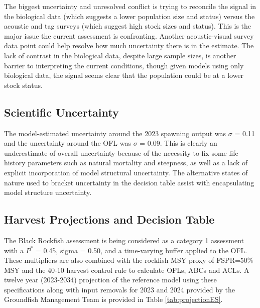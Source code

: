 \documentclass[11pt,
  english,
  letterpaper,
]{article}
\begin{document}
The biggest uncertainty and unresolved conflict is trying to reconcile the signal in the biological data (which suggests a lower population size and status) versus the acoustic and tag surveys (which suggest high stock sizes and status). This is the major issue the current assessment is confronting. Another acoustic-visual survey data point could help resolve how much uncertainty there is in the estimate. The lack of contrast in the biological data, despite large sample sizes, is another barrier to interpreting the current conditions, though given models using only biological data, the signal seems clear that the population could be at a lower stock status.

\hypertarget{scientific-uncertainty}{%
\subsection*{Scientific Uncertainty}\label{scientific-uncertainty}}

The model-estimated uncertainty around the 2023 spawning output was \(\sigma\) = 0.11 and the uncertainty around the OFL was \(\sigma\) = 0.09. This is clearly an underestimate of overall uncertainty because of the necessity to fix some life history parameters such as natural mortality and steepness, as well as a lack of explicit incorporation of model structural uncertainty. The alternative states of nature used to bracket uncertainty in the decision table assist with encapsulating model structure uncertainty.

\hypertarget{harvest-projections-and-decision-table}{%
\subsection*{Harvest Projections and Decision Table}\label{harvest-projections-and-decision-table}}

The Black Rockfish assessment is being considered as a category 1 assessment with a \(P^*\) = 0.45, sigma = 0.50, and a time-varying buffer applied to the OFL. These multipliers are also combined with the rockfish MSY proxy of FSPR=50\% MSY and the 40-10 harvest control rule to calculate OFLs, ABCs and ACLs. A twelve year (2023-2034) projection of the reference model using these specifications along with input removals for 2023 and 2024 provided by the Groundfish Management Team is provided in Table \ref{tab:projectionES}.
\end{document}
